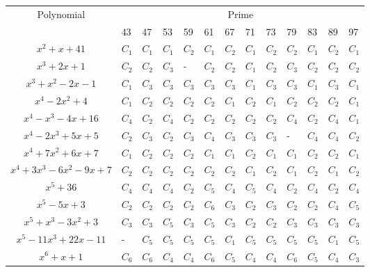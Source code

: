 \documentclass{article}
\begin{document}
\begin{table}[hp]
\begin{center}
\begin{tabular}{|c|llllllllllll|}
\hline
\multirow{2}{*}{Polynomial}        & \multicolumn{12}{c|}{Prime}                                           \\ \cline{2-13} 
                                   & 43  & 47  & 53  & 59  & 61  & 67  & 71  & 73  & 79  & 83  & 89  & 97  \\ \hline
$x^2+x+41$                         & $C_1$ & $C_1$ & $C_1$ & $C_2$ & $C_1$ & $C_2$ & $C_1$ & $C_2$ & $C_2$ & $C_1$ & $C_2$ & $C_1$ \\
$x^3+2x+1$                         & $C_2$ & $C_2$ & $C_3$ & -   & $C_2$ & $C_2$ & $C_1$ & $C_2$ & $C_3$ & $C_2$ & $C_2$ & $C_2$ \\
$x^3+x^2-2x-1$                     & $C_1$ & $C_3$ & $C_3$ & $C_3$ & $C_3$ & $C_3$ & $C_1$ & $C_3$ & $C_3$ & $C_1$ & $C_3$ & $C_1$ \\
$x^4-2x^2+4$                       & $C_1$ & $C_2$ & $C_2$ & $C_2$ & $C_2$ & $C_1$ & $C_2$ & $C_1$ & $C_2$ & $C_2$ & $C_2$ & $C_1$ \\
$x^4-x^3-4x+16$                    & $C_4$ & $C_2$ & $C_4$ & $C_2$ & $C_2$ & $C_2$ & $C_2$ & $C_2$ & $C_4$ & $C_2$ & $C_4$ & $C_1$ \\
$ x^4 - 2x^3 + 5x + 5$             & $C_2$ & $C_3$ & $C_2$ & $C_3$ & $C_4$ & $C_3$ & $C_3$ & $C_3$ & -   & $C_4$ & $C_4$ & $C_2$ \\
$x^4 + 7x^2 + 6x + 7$              & $C_1$ & $C_2$ & $C_2$ & $C_2$ & $C_1$ & $C_1$ & $C_2$ & $C_1$ & $C_1$ & $C_2$ & $C_2$ & $C_1$ \\
$ x^4 + 3x^3 - 6x^2 - 9x + 7$      & $C_2$ & $C_2$ & $C_2$ & $C_2$ & $C_2$ & $C_2$ & $C_1$ & $C_2$ & $C_1$ & $C_2$ & $C_1$ & $C_2$ \\
$ x^5 + 36$                        & $C_4$ & $C_4$ & $C_4$ & $C_2$ & $C_5$ & $C_4$ & $C_5$ & $C_4$ & $C_2$ & $C_4$ & $C_2$ & $C_4$ \\
$ x^5 - 5x + 3$                    & $C_2$ & $C_2$ & $C_2$ & $C_2$ & $C_6$ & $C_3$ & $C_2$ & $C_3$ & $C_2$ & $C_2$ & $C_4$ & $C_5$ \\
$ x^5 + x^3 - 3x^2 + 3$            & $C_3$ & $C_3$ & $C_5$ & $C_3$ & $C_5$ & $C_3$ & $C_2$ & $C_2$ & $C_3$ & $C_3$ & $C_3$ & $C_3$ \\
$ x^5 - 11x^3 + 22x - 11 $         & -   & $C_5$ & $C_5$ & $C_5$ & $C_5$ & $C_1$ & $C_5$ & $C_5$ & $C_5$ & $C_5$ & $C_1$ & $C_5$ \\
$ x^6 + x + 1 $                    & $C_6$ & $C_6$ & $C_4$ & $C_4$ & $C_6$ & $C_5$ & $C_4$ & $C_4$ & $C_6$ & $C_5$ & $C_4$ & $C_3$ \\

\end{tabular}
\end{center}
\end{table}
\end{document}

